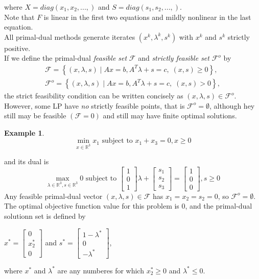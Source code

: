 \documentclass[a4paper,10 pt,titlepage,twoside]{book}
\theoremstyle{plain}
\theoremstyle{definition}
\newtheorem{ex}[thm]{Example}
\theoremstyle{remark}
\begin{document}
where $X = diag(x_{1}, x_{2},...,)$ and $S = diag(s_{1}, s_{2},...,)$.\\ Note that $\mathit{F}$ is linear in the first two equations and mildly nonlinear in the last equation. \\ All primal-dual methods generate iterates $(x^{k},\lambda^{k},s^{k})$ with $x^{k}$ and $s^{k}$ strictly positive.\\
If we define the primal-dual \textit{feasible set} $\mathcal{F}$ and \textit{strictly feasible set} $\mathcal{F}^{o}$ by
\begin{align*}
\mathcal{F} = \left\lbrace(x,\lambda,s)\;|\;Ax = b, A^{T}\lambda+s =c,\;(x,s)\geq0\right\rbrace, \\
\mathcal{F}^{o} = \left\lbrace(x,\lambda,s)\;|\;Ax = b, A^{T}\lambda+s =c,\;(x,s)>0\right\rbrace, 
\end{align*}
the strict feasibility condition can be written concisely as $(x,\lambda,s)\in\mathcal{F}^{o}$.\\
However, some LP have \textit{no} strictly feasible points, that is $\mathcal{F}^{o}=\emptyset$, although hey still may be feasible $(\mathcal{F}=0)$ and still may have finite optimal solutions.
\begin{ex}
	\begin{equation*}
	\min\limits_{x\in\mathbb{R}^{3}} x_{1} \text{ subject to }x_{1} + x_{3} = 0, x\geq0
	\end{equation*}

and its dual is 
	\begin{equation*}
\max\limits_{\lambda\in\mathbb{R}^{3}, s\in\mathbb{R}^{3}} 0 \text{ subject to } \begin{bmatrix}1\\0\\1\end{bmatrix}\lambda+\begin{bmatrix}
s_{1}\\s_{2}\\s_{3}
\end{bmatrix}=\begin{bmatrix}1\\0\\0\end{bmatrix}, s\geq0 
\end{equation*}
Any feasible primal-dual vector $(x, \lambda, s)\in\mathcal{F}$ has $x_{1}= x_{2}= s_{2}= 0$, so $\mathcal{F}^{o}=\emptyset$. The optimal objective function value for this problem is 0, and the primal-dual solutionn set is defined by
\begin{center}
$x^{*} = \begin{bmatrix}
0\\x^{*}_{2}\\ 0
\end{bmatrix}$ and $s^{*}=\begin{bmatrix}
1-\lambda^{*}\\0\\-\lambda^{*}
\end{bmatrix}$,  
\end{center}
where $x^{*}$ and $\lambda^{*}$ are any numberes for which $x_{2}^{*}\geq0$ and $\lambda^{*}\leq0$.
\end{ex}
\end{document}
